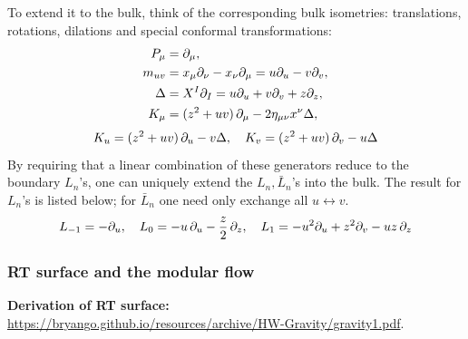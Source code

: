 \documentclass[11pt,a4paper]{article}
\begin{document}
	To extend it to the bulk, think of the corresponding bulk isometries: translations, rotations, dilations and special conformal transformations:
	\begin{equation}
	\begin{aligned}
		P_\mu
		&= \partial_{\mu},\\
		m_{uv}
		&= x_\mu \partial_{\nu} - x_\nu \partial_{\mu}
		= u\partial_{u} - v\partial_{v},\\
		\Delta
		&= X^I \partial_{I}
		= u\partial_{u} + v\partial_{v} + z\partial_{z},\\
		K_\mu
		&= (z^2 + uv)\,\partial_{\mu}
			- 2\eta_{\mu\nu} x^\nu \Delta,
	\end{aligned}
	\end{equation}
	\begin{equation}
		K_u = (z^2 + uv)\,\partial_{u} - v \Delta,
	\quad
		K_v = (z^2 + uv)\,\partial_{v} - u \Delta
	\end{equation}
	By requiring that a linear combination of these generators reduce to the boundary $L_n$'s, one can uniquely extend the $L_n,\bar{L}_n$'s into the bulk. The result for $L_n$'s is listed below; for $\bar{L}_n$ one need only exchange all $u\leftrightarrow v$.
	\begin{equation}
		L_{-1} = -\partial_{u},
	\quad
		L_0 = -u\,\partial_{u} - \frac{z}{2}\,\partial_{z},
	\quad
		L_1 = -u^2\partial_{u} + z^2 \partial_{v}
			- uz\,\partial_{z}
	\end{equation}

\subsubsection{RT surface and the modular flow}

\textbf{Derivation of RT surface:} \\
 \url{https://bryango.github.io/resources/archive/HW-Gravity/gravity1.pdf}. 
\end{document}
